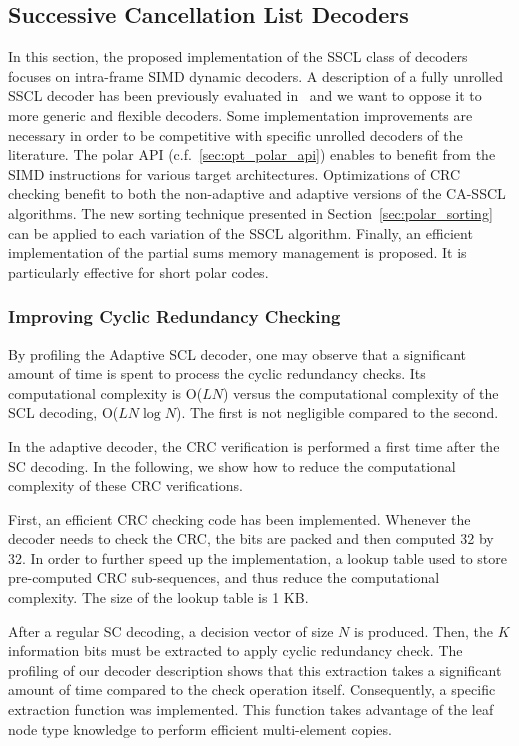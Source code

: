 \subsection{Successive Cancellation List Decoders}

In this section, the proposed implementation of the SSCL class of decoders
focuses on intra-frame SIMD dynamic decoders. A description of a fully unrolled
SSCL decoder has been previously evaluated in~\cite{Sarkis2016} and we want to
oppose it to more generic and flexible decoders. Some implementation
improvements are necessary in order to be competitive with specific unrolled
decoders of the literature. The polar API (c.f.~\ref{sec:opt_polar_api}) enables
to benefit from the SIMD instructions for various target architectures.
Optimizations of CRC checking benefit to both the non-adaptive and adaptive
versions of the CA-SSCL algorithms. The new sorting technique presented in
Section~\ref{sec:polar_sorting} can be applied to each variation of the SSCL
algorithm. Finally, an efficient implementation of the partial sums memory
management is proposed. It is particularly effective for short polar codes.

\subsubsection{Improving Cyclic Redundancy Checking}
\label{sec:polar_crc}

By profiling the Adaptive SCL decoder, one may observe that a significant amount
of time is spent to process the cyclic redundancy checks. Its computational
complexity is O($LN$) versus the computational complexity of the SCL decoding,
O($LN\log N$). The first is not negligible compared to the second.

In the adaptive decoder, the CRC verification is performed a first time after
the SC decoding. In the following, we show how to reduce the computational
complexity of these CRC verifications.

First, an efficient CRC checking code has been implemented. Whenever the decoder
needs to check the CRC, the bits are packed and then computed 32 by 32. In order
to further speed up the implementation, a lookup table used to store
pre-computed CRC sub-sequences, and thus reduce the computational complexity.
The size of the lookup table is 1 KB.

After a regular SC decoding, a decision vector of size $N$ is produced. Then,
the $K$ information bits must be extracted to apply cyclic redundancy check. The
profiling of our decoder description shows that this extraction takes a
significant amount of time compared to the check operation itself. Consequently,
a specific extraction function was implemented. This function takes advantage of
the leaf node type knowledge to perform efficient multi-element copies.

